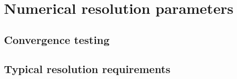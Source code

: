 \chapter{Numerical resolution parameters}

\section{Convergence testing}


\section{Typical resolution requirements}

